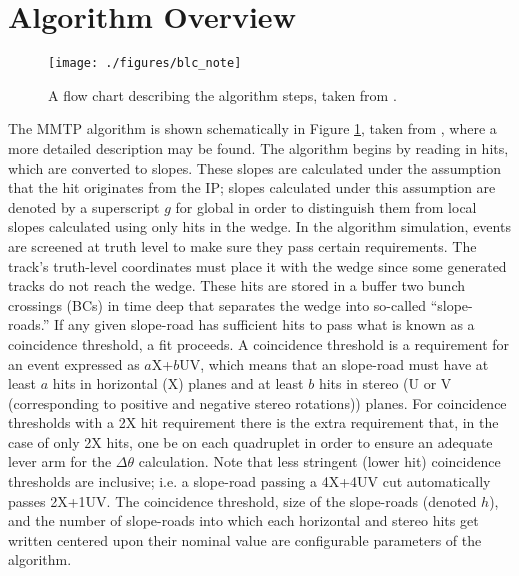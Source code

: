 \section{Algorithm Overview}
\label{sec:algovr}
\begin{figure}[!htbp]\captionsetup{justification=centering}\captionsetup{justification=centering}
  \centering
  \texttt{[image: ./figures/blc\_note]}
  \caption{\label{fig:flowchart}A flow chart describing the algorithm steps, taken from \cite{blcnote}.}
\end{figure}
The MMTP algorithm is shown schematically in Figure \ref{fig:flowchart}, taken from \cite{blcnote}, where a more detailed description may be found.  The algorithm begins by reading in hits, which are converted to slopes.  These slopes are calculated under the assumption that the hit originates from the IP; slopes calculated under this assumption are denoted by a superscript $g$ for global in order to distinguish them from local slopes calculated using only hits in the wedge.  In the algorithm simulation, events are screened at truth level to make sure they pass certain requirements.  The track's truth-level coordinates must place it with the wedge since some generated tracks do not reach the wedge.  These hits are stored in a buffer two bunch crossings (BCs) in time deep that separates the wedge into so-called ``slope-roads.''  If any given slope-road has sufficient hits to pass what is known as a coincidence threshold, a fit proceeds.  A coincidence threshold is a requirement for an event expressed as $a$X+$b$UV, which means that an slope-road must have at least $a$ hits in horizontal (X) planes and at least $b$ hits in stereo (U or V (corresponding to positive and negative stereo rotations)) planes.  For coincidence thresholds with a 2X hit requirement there is the extra requirement that, in the case of only 2X hits, one be on each quadruplet in order to ensure an adequate lever arm for the $\Delta\theta$ calculation.  Note that less stringent (lower hit) coincidence thresholds are inclusive; i.e. a slope-road passing a 4X+4UV cut automatically passes 2X+1UV.  The coincidence threshold, size of the slope-roads (denoted $h$), and the number of slope-roads into which each horizontal and stereo hits get written centered upon their nominal value are configurable parameters of the algorithm.

